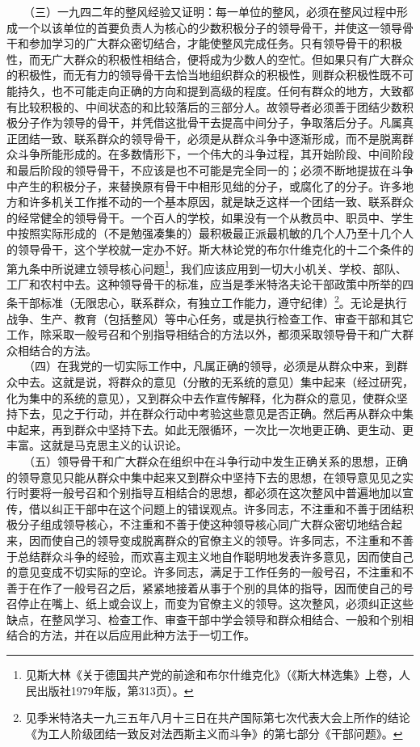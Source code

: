 \documentclass[cn,11pt,chinese]{elegantbook}
\begin{document}
　　（三）一九四二年的整风经验又证明：每一单位的整风，必须在整风过程中形成一个以该单位的首要负责人为核心的少数积极分子的领导骨干，并使这一领导骨干和参加学习的广大群众密切结合，才能使整风完成任务。只有领导骨干的积极性，而无广大群众的积极性相结合，便将成为少数人的空忙。但如果只有广大群众的积极性，而无有力的领导骨干去恰当地组织群众的积极性，则群众积极性既不可能持久，也不可能走向正确的方向和提到高级的程度。任何有群众的地方，大致都有比较积极的、中间状态的和比较落后的三部分人。故领导者必须善于团结少数积极分子作为领导的骨干，并凭借这批骨干去提高中间分子，争取落后分子。凡属真正团结一致、联系群众的领导骨干，必须是从群众斗争中逐渐形成，而不是脱离群众斗争所能形成的。在多数情形下，一个伟大的斗争过程，其开始阶段、中间阶段和最后阶段的领导骨干，不应该是也不可能是完全同一的；必须不断地提拔在斗争中产生的积极分子，来替换原有骨干中相形见绌的分子，或腐化了的分子。许多地方和许多机关工作推不动的一个基本原因，就是缺乏这样一个团结一致、联系群众的经常健全的领导骨干。一个百人的学校，如果没有一个从教员中、职员中、学生中按照实际形成的（不是勉强凑集的）最积极最正派最机敏的几个人乃至十几个人的领导骨干，这个学校就一定办不好。斯大林论党的布尔什维克化的十二个条件的第九条中所说建立领导核心问题\footnote[1]{ 见斯大林《关于德国共产党的前途和布尔什维克化》（《斯大林选集》上卷，人民出版社1979年版，第313页）。}，我们应该应用到一切大小机关、学校、部队、工厂和农村中去。这种领导骨干的标准，应当是季米特洛夫论干部政策中所举的四条干部标准（无限忠心，联系群众，有独立工作能力，遵守纪律）\footnote[2]{ 见季米特洛夫一九三五年八月十三日在共产国际第七次代表大会上所作的结论《为工人阶级团结一致反对法西斯主义而斗争》的第七部分《干部问题》。}。无论是执行战争、生产、教育（包括整风）等中心任务，或是执行检查工作、审查干部和其它工作，除采取一般号召和个别指导相结合的方法以外，都须采取领导骨干和广大群众相结合的方法。\\
　　（四）在我党的一切实际工作中，凡属正确的领导，必须是从群众中来，到群众中去。这就是说，将群众的意见（分散的无系统的意见）集中起来（经过研究，化为集中的系统的意见），又到群众中去作宣传解释，化为群众的意见，使群众坚持下去，见之于行动，并在群众行动中考验这些意见是否正确。然后再从群众中集中起来，再到群众中坚持下去。如此无限循环，一次比一次地更正确、更生动、更丰富。这就是马克思主义的认识论。\\
　　（五）领导骨干和广大群众在组织中在斗争行动中发生正确关系的思想，正确的领导意见只能从群众中集中起来又到群众中坚持下去的思想，在领导意见见之实行时要将一般号召和个别指导互相结合的思想，都必须在这次整风中普遍地加以宣传，借以纠正干部中在这个问题上的错误观点。许多同志，不注重和不善于团结积极分子组成领导核心，不注重和不善于使这种领导核心同广大群众密切地结合起来，因而使自己的领导变成脱离群众的官僚主义的领导。许多同志，不注重和不善于总结群众斗争的经验，而欢喜主观主义地自作聪明地发表许多意见，因而使自己的意见变成不切实际的空论。许多同志，满足于工作任务的一般号召，不注重和不善于在作了一般号召之后，紧紧地接着从事于个别的具体的指导，因而使自己的号召停止在嘴上、纸上或会议上，而变为官僚主义的领导。这次整风，必须纠正这些缺点，在整风学习、检查工作、审查干部中学会领导和群众相结合、一般和个别相结合的方法，并在以后应用此种方法于一切工作。\\
\end{document}
